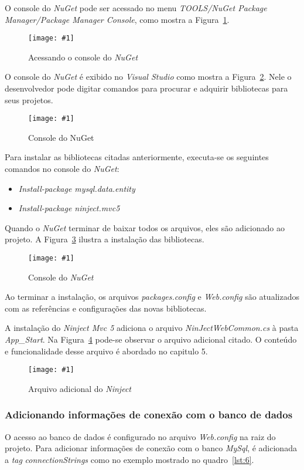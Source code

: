 \documentclass[a4paper,12pt]{article}
\newcommand{\figura}[3] {
	\begin{figure}[ht]
		\centering
		\texttt{[image: \#1]}
		\caption{#2}
		\label{#3}
	\end{figure}
	\FloatBarrier
}
\newcommand{\est}[1] {
\textit{#1}}
\newcommand{\arquivo}[1] {
\textit{#1}}
\newcommand{\xmlcode}[3] {
	
}
\begin{document}
O console do \est{NuGet} pode ser acessado no menu \est{TOOLS/NuGet Package Manager/Package Manager Console}, como mostra a Figura~\ref{fig:20}.

\figura{20.png}{Acessando o console do \est{NuGet}}{fig:20}

O console do \est{NuGet} é exibido no \est{Visual Studio} como mostra a Figura~\ref{fig:21}. Nele o desenvolvedor pode digitar comandos para procurar e adquirir bibliotecas para seus projetos.

\figura{21.png}{Console do NuGet}{fig:21}

Para instalar as bibliotecas citadas anteriormente, executa-se os seguintes comandos no console do \est{NuGet}:

\begin{itemize}
  \item \est{Install-package mysql.data.entity}
  \item \est{Install-package ninject.mvc5}
\end{itemize}

Quando o \est{NuGet} terminar de baixar todos os arquivos, eles são adicionado ao projeto. A Figura~\ref{fig:22} ilustra a instalação das bibliotecas.

\figura{22.png}{Console do \est{NuGet}}{fig:22}

Ao terminar a instalação, os arquivos \arquivo{packages.config} e \arquivo{Web.config} são atualizados com as referências e configurações das novas bibliotecas.

A instalação do \est{Ninject Mvc 5} adiciona o arquivo \arquivo{NinJectWebCommon.cs} à pasta \est{App\_Start}. Na Figura~\ref{fig:23} pode-se observar o arquivo adicional citado. O conteúdo e funcionalidade desse arquivo é abordado no capitulo 5.

\figura{23.png}{Arquivo adicional do \est{Ninject}}{fig:23}

\subsubsection{Adicionando informações de conexão com o banco de dados}

O acesso ao banco de dados é configurado no arquivo \arquivo{Web.config} na raiz do projeto. Para adicionar informações de conexão com o banco \est{MySql}, é adicionada a \est{tag} \est{connectionStrings} como no exemplo mostrado no quadro~\ref{lst:6}.

\xmlcode{code/6.txt}{Adicionando configurações de conexão ao \arquivo{Web.xml}}{lst:6}
\end{document}
